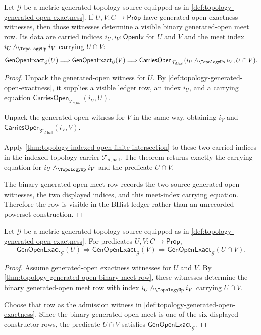 \begin{theorem}
\label{thm:topology-generated-open-binary-meet-row}
Let $\mathcal{G}$ be a metric-generated topology source equipped as in \autoref{def:topology-generated-open-exactness}. If $U,V:C\to\mathsf{Prop}$ have generated-open exactness witnesses, then those witnesses determine a visible binary generated-open meet row. Its data are carried indices $i_U,i_V:\mathsf{OpenIx}$ for $U$ and $V$ and the meet index $i_U\wedge_{\TopologyUp}i_V$ carrying $U\cap V$:
$$
\mathsf{GenOpenExact}_{\mathcal{G}}(U)
\Longrightarrow
\mathsf{GenOpenExact}_{\mathcal{G}}(V)
\Longrightarrow
\mathsf{CarriesOpen}_{\mathcal{T}_{d,\mathsf{ball}}}(i_U\wedge_{\TopologyUp}i_V,U\cap V).
$$
\end{theorem}
\begin{proof}
Unpack the generated-open witness for $U$. By \autoref{def:topology-generated-open-exactness}, it supplies a visible ledger row, an index $i_U$, and a carrying equation $\mathsf{CarriesOpen}_{\mathcal{T}_{d,\mathsf{ball}}}(i_U,U)$.

Unpack the generated-open witness for $V$ in the same way, obtaining $i_V$ and $\mathsf{CarriesOpen}_{\mathcal{T}_{d,\mathsf{ball}}}(i_V,V)$.

Apply \autoref{thm:topology-indexed-open-finite-intersection} to these two carried indices in the indexed topology carrier $\mathcal{T}_{d,\mathsf{ball}}$. The theorem returns exactly the carrying equation for $i_U\wedge_{\TopologyUp}i_V$ and the predicate $U\cap V$.

The binary generated-open meet row records the two source generated-open witnesses, the two displayed indices, and this meet-index carrying equation. Therefore the row is visible in the BHist ledger rather than an unrecorded powerset construction.
\end{proof}

\begin{theorem}
\label{thm:topology-generated-open-binary-meet-admission}
Let $\mathcal{G}$ be a metric-generated topology source equipped as in \autoref{def:topology-generated-open-exactness}. For predicates $U,V:C\to\mathsf{Prop}$,
$$
\mathsf{GenOpenExact}_{\mathcal{G}}(U)
\Longrightarrow
\mathsf{GenOpenExact}_{\mathcal{G}}(V)
\Longrightarrow
\mathsf{GenOpenExact}_{\mathcal{G}}(U\cap V).
$$
\end{theorem}
\begin{proof}
Assume generated-open exactness witnesses for $U$ and $V$. By \autoref{thm:topology-generated-open-binary-meet-row}, these witnesses determine the binary generated-open meet row with index $i_U\wedge_{\TopologyUp}i_V$ carrying $U\cap V$.

Choose that row as the admission witness in \autoref{def:topology-generated-open-exactness}. Since the binary generated-open meet is one of the six displayed constructor rows, the predicate $U\cap V$ satisfies $\mathsf{GenOpenExact}_{\mathcal{G}}$.
\end{proof}

